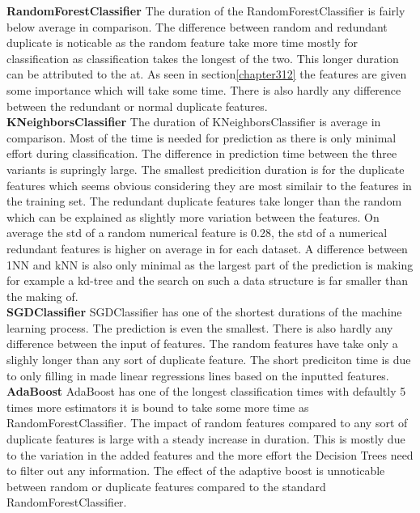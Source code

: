 \documentclass[a4paper,10pt]{article}
\begin{document}
\textbf{RandomForestClassifier} The duration of the RandomForestClassifier is fairly below average in comparison. The difference between random and redundant duplicate is noticable as the random feature take more time mostly for classification as classification takes the longest of the two. This longer duration can be attributed to the at. As seen in section\ref{chapter312} the features are given some importance which will take some time. There is also hardly any difference between the redundant or normal duplicate features.  \\

\textbf{KNeighborsClassifier} The duration of KNeighborsClassifier is average in comparison. Most of the time is needed for prediction as there is only minimal effort during classification. The difference in prediction time between the three variants is supringly large. The smallest predicition duration is for the duplicate features which seems obvious considering they are most similair to the features in the training set. The redundant duplicate features take longer than the random which can be explained as slightly more variation between the features. On average the std of a random numerical feature is 0.28, the std of a numerical redundant features is higher on average in for each dataset. A difference between 1NN and kNN is also only minimal as the largest part of the prediction is making for example a kd-tree and the search on such a data structure is far smaller than the making of.\\

\textbf{SGDClassifier} SGDClassifier has one of the shortest durations of the machine learning process. The prediction is even the smallest. There is also hardly any difference between the input of features. The random features have take only  a slighly longer than any sort of duplicate feature. The short prediciton time is due to only filling in made linear regressions lines based on the inputted features. \\

\textbf{AdaBoost} AdaBoost has one of the longest classification times with defaultly 5 times more estimators it is bound to take some more time as RandomForestClassifier. The impact of random features compared to any sort of duplicate features is large with a steady increase in duration. This is mostly due to the variation in the added features and the more effort the Decision Trees need to filter out any information. The effect of the adaptive boost is unnoticable between random or duplicate features compared to the standard RandomForestClassifier.  \\
\end{document}
